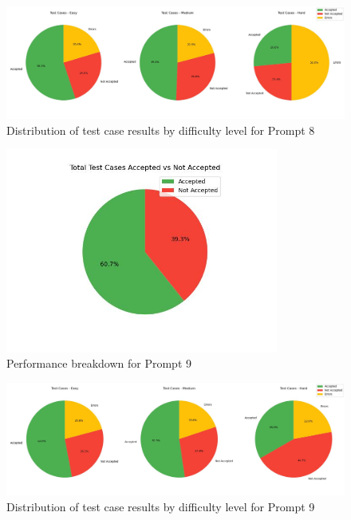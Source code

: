 \begin{figure}[H]
    \centering
    \includegraphics[width=1\textwidth]{figures/8/pie_difficulty.jpg}
    \caption{Distribution of test case results by difficulty level for Prompt 8}
    \label{fig:prompt8_difficulty}
\end{figure}

\begin{figure}[H]
    \centering
    \includegraphics[width=0.8\textwidth]{figures/9/total_accepted_not.jpg}
    \caption{Performance breakdown for Prompt 9}
    \label{fig:prompt9_performance}
\end{figure}

\begin{figure}[H]
    \centering
    \includegraphics[width=1\textwidth]{figures/9/pie_difficulty.jpg}
    \caption{Distribution of test case results by difficulty level for Prompt 9}
    \label{fig:prompt9_difficulty}
\end{figure}

